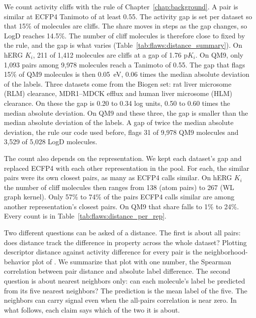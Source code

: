 We count activity cliffs with the rule of Chapter~\ref{chap:background}. A pair is similar at ECFP4 Tanimoto of at least 0.55. The activity gap is set per dataset so that 15\% of molecules are cliffs. The share moves in steps as the gap changes, so LogD reaches 14.5\%. The number of cliff molecules is therefore close to fixed by the rule, and the gap is what varies (Table~\ref{tab:flaws:distance_summary}). On hERG $K_i$, 211 of 1,412 molecules are cliffs at a gap of 1.76 p$K_i$. On QM9, only 1,093 pairs among 9,978 molecules reach a Tanimoto of 0.55. The gap that flags 15\% of QM9 molecules is then 0.05~eV, 0.06 times the median absolute deviation of the labels. Three datasets come from the Biogen set: rat liver microsome (RLM) clearance, MDR1--MDCK efflux and human liver microsome (HLM) clearance. On these the gap is 0.20 to 0.34 log units, 0.50 to 0.60 times the median absolute deviation. On QM9 and these three, the gap is smaller than the median absolute deviation of the labels. A gap of twice the median absolute deviation, the rule our code used before, flags 31 of 9,978 QM9 molecules and 3,529 of 5,028 LogD molecules.

The count also depends on the representation. We kept each dataset's gap and replaced ECFP4 with each other representation in the pool. For each, the similar pairs were its own closest pairs, as many as ECFP4 calls similar. On hERG $K_i$ the number of cliff molecules then ranges from 138 (atom pairs) to 267 (WL graph kernel). Only 57\% to 74\% of the pairs ECFP4 calls similar are among another representation's closest pairs. On QM9 that share falls to 1\% to 24\%. Every count is in Table~\ref{tab:flaws:distance_per_rep}.

Two different questions can be asked of a distance. The first is about all pairs: does distance track the difference in property across the whole dataset? Plotting descriptor distance against activity difference for every pair is the neighborhood-behavior plot of \citet{Patterson1996}. We summarize that plot with one number, the Spearman correlation between pair distance and absolute label difference. The second question is about nearest neighbors only: can each molecule's label be predicted from its five nearest neighbors? The prediction is the mean label of the five. The neighbors can carry signal even when the all-pairs correlation is near zero. In what follows, each claim says which of the two it is about.

